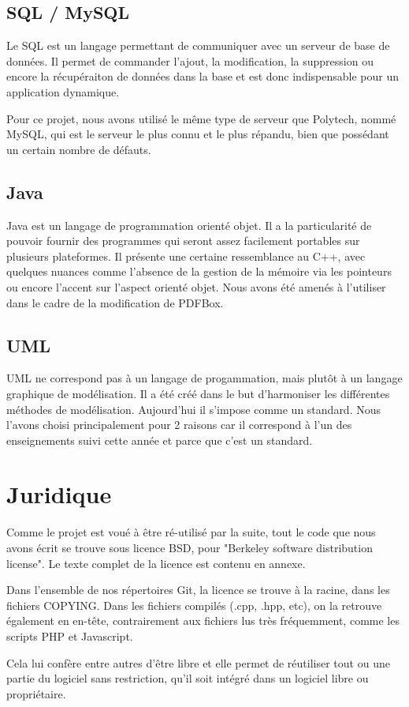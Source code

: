         \subsection{SQL / MySQL}
Le SQL est un langage permettant de communiquer avec un serveur de base de données. 
Il permet de commander l'ajout, la modification, la suppression ou encore la 
récupéraiton de données dans la base et est donc indispensable pour un application 
dynamique.

Pour ce projet, nous avons utilisé le même type de serveur que Polytech, nommé
MySQL, qui est le serveur le plus connu et le plus répandu, bien que possédant 
un certain nombre de défauts.


        \subsection{Java}
Java est un langage de programmation orienté objet. Il a la particularité de 
pouvoir fournir des programmes qui seront assez facilement portables sur plusieurs 
plateformes. Il présente une certaine ressemblance au C++, avec quelques nuances 
comme l'absence de la gestion de la mémoire via les pointeurs ou encore l'accent 
sur l'aspect orienté objet. Nous avons été amenés à l'utiliser dans le cadre de 
la modification de PDFBox. 


       \subsection{UML}
UML ne correspond pas à un langage de progammation, mais plutôt à un langage 
graphique de modélisation. Il a été créé dans le but d'harmoniser les
différentes méthodes de modélisation. Aujourd'hui il s'impose comme un standard. 
Nous l'avons choisi principalement pour 2 raisons car il correspond à l'un des 
enseignements suivi cette année et parce que c'est un standard.



    \section{Juridique}
Comme le projet est voué à être ré-utilisé par la suite, tout le code que nous 
avons écrit se trouve sous licence BSD, pour "Berkeley software distribution
license". Le texte complet de la licence est contenu en annexe.

Dans l'ensemble de nos répertoires Git, la licence se trouve à la racine, dans les
fichiers COPYING. Dans les fichiers compilés (.cpp, .hpp, etc), on la retrouve
également en en-tête, contrairement aux fichiers lus très fréquemment, comme les
scripts PHP et Javascript.

Cela lui confère entre autres d'être libre et elle permet de réutiliser tout ou 
une partie du logiciel sans restriction, qu'il soit intégré dans un logiciel libre 
ou propriétaire.

